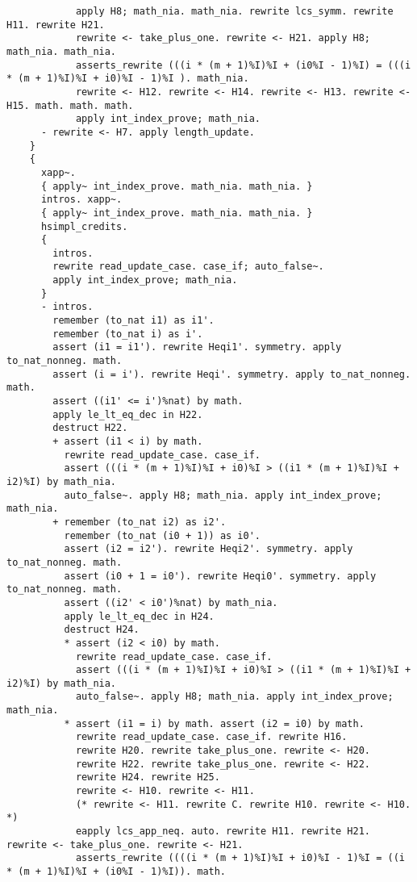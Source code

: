 \begin{verbatim}
            apply H8; math_nia. math_nia. rewrite lcs_symm. rewrite H11. rewrite H21. 
            rewrite <- take_plus_one. rewrite <- H21. apply H8; math_nia. math_nia. 
            asserts_rewrite (((i * (m + 1)%I)%I + (i0%I - 1)%I) = (((i * (m + 1)%I)%I + i0)%I - 1)%I ). math_nia. 
            rewrite <- H12. rewrite <- H14. rewrite <- H13. rewrite <- H15. math. math. math. 
            apply int_index_prove; math_nia. 
      - rewrite <- H7. apply length_update. 
    }
    {
      xapp~. 
      { apply~ int_index_prove. math_nia. math_nia. } 
      intros. xapp~. 
      { apply~ int_index_prove. math_nia. math_nia. } 
      hsimpl_credits. 
      {
        intros. 
        rewrite read_update_case. case_if; auto_false~. 
        apply int_index_prove; math_nia. 
      }
      - intros. 
        remember (to_nat i1) as i1'. 
        remember (to_nat i) as i'. 
        assert (i1 = i1'). rewrite Heqi1'. symmetry. apply to_nat_nonneg. math. 
        assert (i = i'). rewrite Heqi'. symmetry. apply to_nat_nonneg. math. 
        assert ((i1' <= i')%nat) by math. 
        apply le_lt_eq_dec in H22. 
        destruct H22. 
        + assert (i1 < i) by math. 
          rewrite read_update_case. case_if. 
          assert (((i * (m + 1)%I)%I + i0)%I > ((i1 * (m + 1)%I)%I + i2)%I) by math_nia. 
          auto_false~. apply H8; math_nia. apply int_index_prove; math_nia. 
        + remember (to_nat i2) as i2'. 
          remember (to_nat (i0 + 1)) as i0'. 
          assert (i2 = i2'). rewrite Heqi2'. symmetry. apply to_nat_nonneg. math. 
          assert (i0 + 1 = i0'). rewrite Heqi0'. symmetry. apply to_nat_nonneg. math. 
          assert ((i2' < i0')%nat) by math_nia. 
          apply le_lt_eq_dec in H24. 
          destruct H24. 
          * assert (i2 < i0) by math. 
            rewrite read_update_case. case_if. 
            assert (((i * (m + 1)%I)%I + i0)%I > ((i1 * (m + 1)%I)%I + i2)%I) by math_nia. 
            auto_false~. apply H8; math_nia. apply int_index_prove; math_nia. 
          * assert (i1 = i) by math. assert (i2 = i0) by math. 
            rewrite read_update_case. case_if. rewrite H16. 
            rewrite H20. rewrite take_plus_one. rewrite <- H20. 
            rewrite H22. rewrite take_plus_one. rewrite <- H22. 
            rewrite H24. rewrite H25. 
            rewrite <- H10. rewrite <- H11. 
            (* rewrite <- H11. rewrite C. rewrite H10. rewrite <- H10.  *)
            eapply lcs_app_neq. auto. rewrite H11. rewrite H21. rewrite <- take_plus_one. rewrite <- H21. 
            asserts_rewrite ((((i * (m + 1)%I)%I + i0)%I - 1)%I = ((i * (m + 1)%I)%I + (i0%I - 1)%I)). math. 

\end{verbatim}
